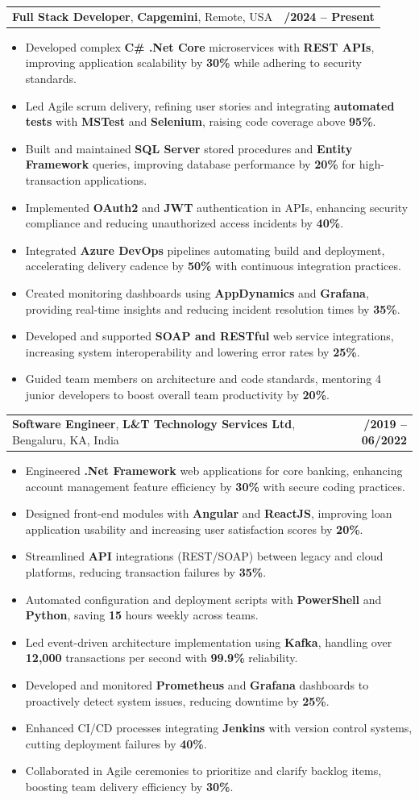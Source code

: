 \documentclass[letterpaper,11pt]{article}
\makeatletter
\newcommand{\resumeItem}[1]{
  \item\footnotesize{
    {#1 \vspace{-2pt}}
  }
}
\newcommand{\resumeSubheading}[4]{
  \vspace{-2pt}\item
    \begin{tabular*}{1.0\textwidth}[t]{l@{\extracolsep{\fill}}r}
      \textbf{\fontsize{10pt}{14pt}\selectfont #3}, \textbf{\fontsize{10pt}{14pt}\selectfont #1}, \fontsize{10pt}{14pt}\selectfont #4 & \textbf{\fontsize{10pt}{14pt}\selectfont #2} \\
    \end{tabular*}\vspace{-7pt}
}
\newcommand{\resumeItemListStart}{\begin{itemize}[leftmargin=*]}
\newcommand{\resumeItemListEnd}{\end{itemize}\vspace{-5pt}}
\makeatother
\begin{document}
    \resumeSubheading
        {Capgemini}{01/2024 -- Present}
        {Full Stack Developer}{Remote, USA}
      \resumeItemListStart
        \resumeItem{Developed complex \textbf{C\# .Net Core} microservices with \textbf{REST APIs}, improving application scalability by \textbf{30\%} while adhering to security standards.}
        \resumeItem{Led Agile scrum delivery, refining user stories and integrating \textbf{automated tests} with \textbf{MSTest} and \textbf{Selenium}, raising code coverage above \textbf{95\%}.}
        \resumeItem{Built and maintained \textbf{SQL Server} stored procedures and \textbf{Entity Framework} queries, improving database performance by \textbf{20\%} for high-transaction applications.}
        \resumeItem{Implemented \textbf{OAuth2} and \textbf{JWT} authentication in APIs, enhancing security compliance and reducing unauthorized access incidents by \textbf{40\%}.}
        \resumeItem{Integrated \textbf{Azure DevOps} pipelines automating build and deployment, accelerating delivery cadence by \textbf{50\%} with continuous integration practices.}
        \resumeItem{Created monitoring dashboards using \textbf{AppDynamics} and \textbf{Grafana}, providing real-time insights and reducing incident resolution times by \textbf{35\%}.}
        \resumeItem{Developed and supported \textbf{SOAP and RESTful} web service integrations, increasing system interoperability and lowering error rates by \textbf{25\%}.}
        \resumeItem{Guided team members on architecture and code standards, mentoring 4 junior developers to boost overall team productivity by \textbf{20\%}.}
      \resumeItemListEnd

    \resumeSubheading
        {L\&T Technology Services Ltd}{08/2019 -- 06/2022}
        {Software Engineer}{Bengaluru, KA, India}
      \resumeItemListStart
        \resumeItem{Engineered \textbf{.Net Framework} web applications for core banking, enhancing account management feature efficiency by \textbf{30\%} with secure coding practices.}
        \resumeItem{Designed front-end modules with \textbf{Angular} and \textbf{ReactJS}, improving loan application usability and increasing user satisfaction scores by \textbf{20\%}.}
        \resumeItem{Streamlined \textbf{API} integrations (REST/SOAP) between legacy and cloud platforms, reducing transaction failures by \textbf{35\%}.}
        \resumeItem{Automated configuration and deployment scripts with \textbf{PowerShell} and \textbf{Python}, saving \textbf{15} hours weekly across teams.}
        \resumeItem{Led event-driven architecture implementation using \textbf{Kafka}, handling over \textbf{12,000} transactions per second with \textbf{99.9\%} reliability.}
        \resumeItem{Developed and monitored \textbf{Prometheus} and \textbf{Grafana} dashboards to proactively detect system issues, reducing downtime by \textbf{25\%}.}
        \resumeItem{Enhanced CI/CD processes integrating \textbf{Jenkins} with version control systems, cutting deployment failures by \textbf{40\%}.}
        \resumeItem{Collaborated in Agile ceremonies to prioritize and clarify backlog items, boosting team delivery efficiency by \textbf{30\%}.}
      \resumeItemListEnd
\end{document}
